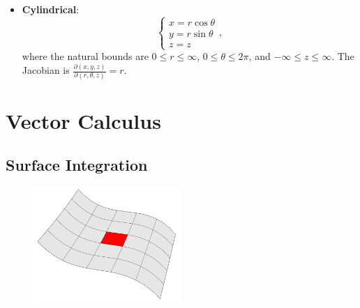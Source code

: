\documentclass[12pt]{article}
\begin{document}
{\begin{itemize}
    Also note that $x^2 + y^2 + z^2 = \rho^2$, a helpful fact for some integrals.

    \item \textbf{Cylindrical}: \[\begin{cases}
        x = r\cos\theta\\
        y = r\sin\theta\\
        z = z
    \end{cases},\] where the natural bounds are $0 \leq r \leq \infty$, $0 \leq \theta \leq 2\pi$, and $-\infty \leq z \leq \infty$. The Jacobian is $\frac{\partial(x,y,z)}{\partial(r, \theta, z)} = r$.
\end{itemize}

\section{Vector Calculus}
\subsection{Surface Integration}
\begin{figure}[!ht]
    \centering
    \includegraphics[width=0.5\textwidth]{misc/surface.png}
\end{figure}
}
\end{document}
